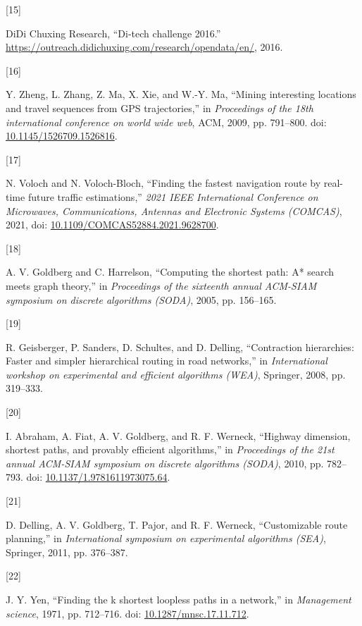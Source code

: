 \documentclass[
  10pt,
  letterpaper,
  lettersize,
  journal]{IEEEtran}
\newlength{\cslhangindent}
\newlength{\csllabelwidth}
\newenvironment{CSLReferences}[2] %
 {\begin{list}{}{%
  \setlength{\itemindent}{0pt}
  \setlength{\leftmargin}{0pt}
  \setlength{\parsep}{0pt}
  \ifodd #1
   \setlength{\leftmargin}{\cslhangindent}
   \setlength{\itemindent}{-1\cslhangindent}
  \fi
  \setlength{\itemsep}{#2\baselineskip}}}
 {\end{list}}
\newcommand{\CSLLeftMargin}[1]{\parbox[t]{\csllabelwidth}{\strut#1\strut}}
\newcommand{\CSLRightInline}[1]{\parbox[t]{\linewidth - \csllabelwidth}{\strut#1\strut}}
\begin{document}
\begin{CSLReferences}{0}{0}
\CSLLeftMargin{{[}15{]} }%
\CSLRightInline{DiDi Chuxing Research, {``Di-tech challenge 2016.''}
\url{https://outreach.didichuxing.com/research/opendata/en/}, 2016.}

\CSLLeftMargin{{[}16{]} }%
\CSLRightInline{Y. Zheng, L. Zhang, Z. Ma, X. Xie, and W.-Y. Ma,
{``Mining interesting locations and travel sequences from GPS
trajectories,''} in \emph{Proceedings of the 18th international
conference on world wide web}, ACM, 2009, pp. 791--800. doi:
\href{https://doi.org/10.1145/1526709.1526816}{10.1145/1526709.1526816}.}

\CSLLeftMargin{{[}17{]} }%
\CSLRightInline{N. Voloch and N. Voloch-Bloch, {``Finding the fastest
navigation route by real-time future traffic estimations,''} \emph{2021
IEEE International Conference on Microwaves, Communications, Antennas
and Electronic Systems (COMCAS)}, 2021, doi:
\href{https://doi.org/10.1109/COMCAS52884.2021.9628700}{10.1109/COMCAS52884.2021.9628700}.}

\CSLLeftMargin{{[}18{]} }%
\CSLRightInline{A. V. Goldberg and C. Harrelson, {``Computing the
shortest path: A* search meets graph theory,''} in \emph{Proceedings of
the sixteenth annual ACM-SIAM symposium on discrete algorithms (SODA)},
2005, pp. 156--165.}

\CSLLeftMargin{{[}19{]} }%
\CSLRightInline{R. Geisberger, P. Sanders, D. Schultes, and D. Delling,
{``Contraction hierarchies: Faster and simpler hierarchical routing in
road networks,''} in \emph{International workshop on experimental and
efficient algorithms (WEA)}, Springer, 2008, pp. 319--333.}

\CSLLeftMargin{{[}20{]} }%
\CSLRightInline{I. Abraham, A. Fiat, A. V. Goldberg, and R. F. Werneck,
{``Highway dimension, shortest paths, and provably efficient
algorithms,''} in \emph{Proceedings of the 21st annual ACM-SIAM
symposium on discrete algorithms (SODA)}, 2010, pp. 782--793. doi:
\href{https://doi.org/10.1137/1.9781611973075.64}{10.1137/1.9781611973075.64}.}

\CSLLeftMargin{{[}21{]} }%
\CSLRightInline{D. Delling, A. V. Goldberg, T. Pajor, and R. F. Werneck,
{``Customizable route planning,''} in \emph{International symposium on
experimental algorithms (SEA)}, Springer, 2011, pp. 376--387.}

\CSLLeftMargin{{[}22{]} }%
\CSLRightInline{J. Y. Yen, {``Finding the k shortest loopless paths in a
network,''} in \emph{Management science}, 1971, pp. 712--716. doi:
\href{https://doi.org/10.1287/mnsc.17.11.712}{10.1287/mnsc.17.11.712}.}

\end{CSLReferences}
\end{document}
